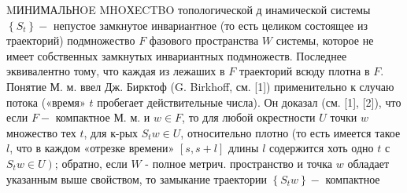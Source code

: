 \documentclass[10pt]{article}
\begin{document}
MИНИМАЛЬНOE MHOХECTBO топологической д инамической системы $\left\{S_{t}\right\}-$ непустое замкнутое инвариантное (то есть целиком состоящее из траекторий) подмножество $F$ фазового пространства $W$ системы, которое не имеет собственных замкнутых инвариантных подмножеств. Последнее эквивалентно тому, что каждая из лежаших в $F$ траекторий всюду плотна в $F$. Понятие М. м. ввел Дж. Бирктоф (G. Birkhoff, см. [1]) применительно к случаю потока («время» $t$ пробегает действительные числа). Он доказал (см. [1], [2]), что если $F-$ компактное М. м. и $w \in F$, то для любой окрестности $U$ точки $w$ множество тех $t$, для к-рых $S_{t} w \in U$, относительно плотно (то есть имеется такое $l$, что в каждом «отрезке времени» $[s, s+l]$ длины $l$ содержится хоть одно $t$ с $\left.S_{t} w \in U\right)$; обратно, если $W$ - полное метрич. пространство и точка $w$ обладает указанным выше свойством, то замыкание траектории $\left\{S_{t} w\right\}-$ компактное
\end{document}
